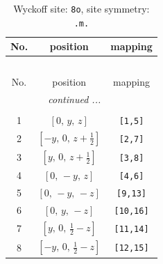 \documentclass[fleqn,8pt]{jsarticle}
\begin{document}
\renewcommand{\arraystretch}{1.2}
\begin{longtable}{ccc}
\caption{Wyckoff site: {\tt 8o}, site symmetry: {\tt .m.}}
 \\
 \hline \hline
No. & position & mapping \\ \hline \endfirsthead

\multicolumn{2}{l}{\tablename\ \thetable{}} \\
 \hline \hline
No. & position & mapping \\ \hline \endhead

 \hline \hline
\multicolumn{2}{r}{\footnotesize\it continued ...} \\ \endfoot

 \hline \hline
\multicolumn{2}{r}{} \\ \endlastfoot

1 & $\left[ 0,\, y,\, z \right]$ & {\tt [1,5]} \\ \hline
2 & $\left[ - y,\, 0,\, z + \frac{1}{2} \right]$ & {\tt [2,7]} \\ \hline
3 & $\left[ y,\, 0,\, z + \frac{1}{2} \right]$ & {\tt [3,8]} \\ \hline
4 & $\left[ 0,\, - y,\, z \right]$ & {\tt [4,6]} \\ \hline
5 & $\left[ 0,\, - y,\, - z \right]$ & {\tt [9,13]} \\ \hline
6 & $\left[ 0,\, y,\, - z \right]$ & {\tt [10,16]} \\ \hline
7 & $\left[ y,\, 0,\, \frac{1}{2} - z \right]$ & {\tt [11,14]} \\ \hline
8 & $\left[ - y,\, 0,\, \frac{1}{2} - z \right]$ & {\tt [12,15]} \\
\end{longtable}
\renewcommand{\arraystretch}{1.2}
\end{document}
